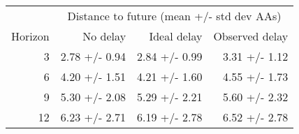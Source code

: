 
\begin{tabular*}{0.7\textwidth}{rrrr}
\toprule
          & \multicolumn{3}{c}{Distance to future (mean +/- std dev AAs)} \\
  Horizon & No delay & Ideal delay & Observed delay \\
\midrule

3 & 2.78 +/- 0.94 & 2.84 +/- 0.99 & 3.31 +/- 1.12 \\
6 & 4.20 +/- 1.51 & 4.21 +/- 1.60 & 4.55 +/- 1.73 \\
9 & 5.30 +/- 2.08 & 5.29 +/- 2.21 & 5.60 +/- 2.32 \\
12 & 6.23 +/- 2.71 & 6.19 +/- 2.78 & 6.52 +/- 2.78 \\

\bottomrule
\end{tabular*}

